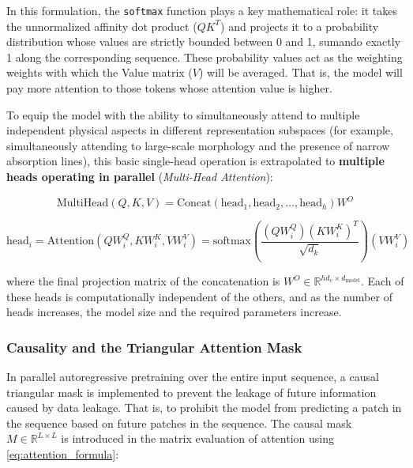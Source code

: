 In this formulation, the \texttt{softmax} function plays a key mathematical role: it takes the unnormalized affinity dot product ($Q K^T$) and projects it to a probability distribution whose values are strictly bounded between 0 and 1, sumando exactly 1 along the corresponding sequence. These probability values act as the weighting weights with which the Value matrix ($V$) will be averaged. That is, the model will pay more attention to those tokens whose attention value is higher.

To equip the model with the ability to simultaneously attend to multiple independent physical aspects in different representation subspaces (for example, simultaneously attending to large-scale morphology and the presence of narrow absorption lines), this basic single-head operation is extrapolated to \textbf{multiple heads operating in parallel} (\textit{Multi-Head Attention}):

\begin{equation}
\text{MultiHead}\left(Q, K, V\right) = \text{Concat}\left(\text{head}_1, \text{head}_2, \dots, \text{head}_h\right) W^O
\label{eq:multihead_formula}
\end{equation}

\begin{equation}
\text{head}_i = \text{Attention}\left(Q W_i^Q, K W_i^K, V W_i^V\right) = \text{softmax}\left(\dfrac{\left(Q W_i^Q\right)\left(K W_i^K\right)^T}{\sqrt{d_k}}\right) \left(V W_i^V\right)
\label{eq:headi_formula}
\end{equation}

where the final projection matrix of the concatenation is $W^O \in \mathbb{R}^{h d_v \times d_{\text{model}}}$. Each of these heads is computationally independent of the others, and as the number of heads increases, the model size and the required parameters increase.

\subsubsection{Causality and the Triangular Attention Mask}

In parallel autoregressive pretraining over the entire input sequence, a causal triangular mask is implemented to prevent the leakage of future information caused by data leakage. That is, to prohibit the model from predicting a patch in the sequence based on future patches in the sequence. The causal mask $M \in \mathbb{R}^{L \times L}$ is introduced in the matrix evaluation of attention using \cref{eq:attention_formula}:

